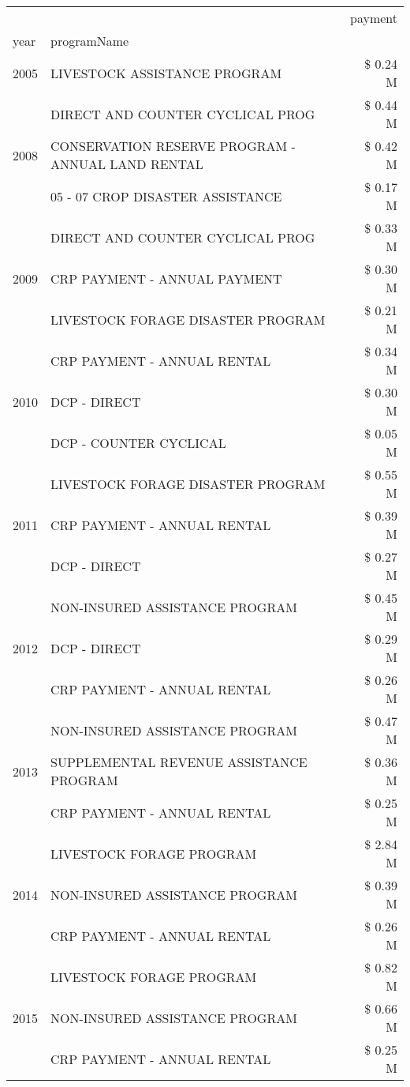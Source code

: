 \begin{tabular}{llr}
\toprule
 &  & payment \\
year & programName &  \\
\midrule
2005 & LIVESTOCK ASSISTANCE PROGRAM & \$ 0.24 M \\
\cline{1-3}
\multirow[t]{3}{*}{2008} & DIRECT AND COUNTER CYCLICAL PROG & \$ 0.44 M \\
 & CONSERVATION RESERVE PROGRAM - ANNUAL LAND RENTAL & \$ 0.42 M \\
 & 05 - 07 CROP DISASTER ASSISTANCE & \$ 0.17 M \\
\cline{1-3}
\multirow[t]{3}{*}{2009} & DIRECT AND COUNTER CYCLICAL PROG & \$ 0.33 M \\
 & CRP PAYMENT - ANNUAL PAYMENT & \$ 0.30 M \\
 & LIVESTOCK FORAGE DISASTER  PROGRAM & \$ 0.21 M \\
\cline{1-3}
\multirow[t]{3}{*}{2010} & CRP PAYMENT - ANNUAL RENTAL & \$ 0.34 M \\
 & DCP - DIRECT & \$ 0.30 M \\
 & DCP - COUNTER CYCLICAL & \$ 0.05 M \\
\cline{1-3}
\multirow[t]{3}{*}{2011} & LIVESTOCK FORAGE DISASTER PROGRAM & \$ 0.55 M \\
 & CRP PAYMENT - ANNUAL RENTAL & \$ 0.39 M \\
 & DCP - DIRECT & \$ 0.27 M \\
\cline{1-3}
\multirow[t]{3}{*}{2012} & NON-INSURED ASSISTANCE PROGRAM & \$ 0.45 M \\
 & DCP - DIRECT & \$ 0.29 M \\
 & CRP PAYMENT - ANNUAL RENTAL & \$ 0.26 M \\
\cline{1-3}
\multirow[t]{3}{*}{2013} & NON-INSURED ASSISTANCE PROGRAM & \$ 0.47 M \\
 & SUPPLEMENTAL REVENUE ASSISTANCE PROGRAM & \$ 0.36 M \\
 & CRP PAYMENT - ANNUAL RENTAL & \$ 0.25 M \\
\cline{1-3}
\multirow[t]{3}{*}{2014} & LIVESTOCK FORAGE PROGRAM & \$ 2.84 M \\
 & NON-INSURED ASSISTANCE PROGRAM & \$ 0.39 M \\
 & CRP PAYMENT - ANNUAL RENTAL & \$ 0.26 M \\
\cline{1-3}
\multirow[t]{3}{*}{2015} & LIVESTOCK FORAGE PROGRAM & \$ 0.82 M \\
 & NON-INSURED ASSISTANCE PROGRAM & \$ 0.66 M \\
 & CRP PAYMENT - ANNUAL RENTAL & \$ 0.25 M \\

\end{tabular}
